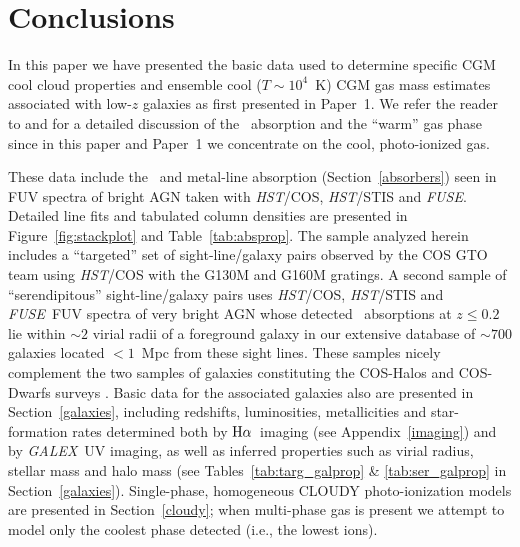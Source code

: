 \documentclass[twocolumn,twocolappendix,tighten,times]{aastex6}
\newcommand{\HI}{\ion{H}{1}}
\newcommand{\OVI}{\ion{O}{6}}
\newcommand{\fuse}{{\sl FUSE}}
\newcommand{\galex}{{\sl GALEX}}
\newcommand{\Ha}{\ensuremath{{\rm H}\alpha}}
\newcommand{\hst}{{\sl HST}}
\begin{document}
\section{Conclusions}
\label{conclusion}


In this paper we have presented the basic data used to determine specific CGM cool 
cloud properties and ensemble cool ($T\sim10^4$~K) CGM gas mass estimates 
associated with low-$z$ galaxies as first presented in Paper~1. We refer the 
reader to \citet{savage14} and \citet{stocke14} for a detailed discussion of the 
\OVI\ absorption and the ``warm'' gas phase since in this paper and Paper~1 we 
concentrate on the cool, photo-ionized gas.

These data include the \HI\ and metal-line absorption (Section~\ref{absorbers}) 
seen in FUV spectra of bright AGN taken with \hst/COS, \hst/STIS and \fuse. 
Detailed line fits and tabulated column densities are presented in 
Figure~\ref{fig:stackplot} and Table~\ref{tab:absprop}. The sample analyzed herein 
includes a ``targeted'' set of sight-line/galaxy pairs observed by the COS GTO 
team using \hst/COS with the G130M and G160M gratings. A second sample of 
``serendipitous'' sight-line/galaxy pairs uses \hst/COS, \hst/STIS and \fuse\ FUV 
spectra of very bright AGN whose detected \HI\ absorptions at $z \leq 0.2$ lie 
within $\sim2$ virial radii of a foreground galaxy in our extensive database of 
$\sim700$ galaxies located $<1$~Mpc from these sight lines. These samples nicely 
complement the two samples of galaxies constituting the COS-Halos and COS-Dwarfs 
surveys \citep{tumlinson11, bordoloi14}. Basic data for the associated galaxies 
also are presented in Section~\ref{galaxies}, including redshifts, luminosities, 
metallicities and star-formation rates determined both by \Ha\ imaging (see 
Appendix~\ref{imaging}) and by \galex\ UV imaging, as well as inferred properties 
such as virial radius, stellar mass and halo mass (see 
Tables~\ref{tab:targ_galprop} \& \ref{tab:ser_galprop} in Section~\ref{galaxies}). 
Single-phase, homogeneous CLOUDY photo-ionization models are presented in 
Section~\ref{cloudy}; when multi-phase gas is present we attempt to model only the 
coolest phase detected (i.e., the lowest ions).
\end{document}
